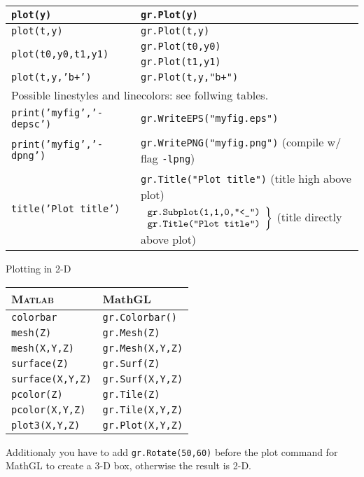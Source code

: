 \documentclass[a4paper]{article}
\newcommand{\cd}{\texttt}
\begin{document}
\begin{center}
\begin{tabular}{l|l}
  \hline
  \cd{plot(y)} & \cd{gr.Plot(y)} \\
  \hline
  \cd{plot(t,y)} & \cd{gr.Plot(t,y)} \\
  \hline
  \multirow{2}{15em}{\cd{plot(t0,y0,t1,y1)}} & \cd{gr.Plot(t0,y0)} \\
                                            & \cd{gr.Plot(t1,y1)} \\
  \cd{plot(t,y,'b+')} & \cd{gr.Plot(t,y,"b+")} \\
  \hline
  \multicolumn{2}{l}{Possible linestyles and linecolors: see follwing tables.} \\
  \hline
  \cd{print('myfig','-depsc')} & \cd{gr.WriteEPS("myfig.eps")} \\
  \cd{print('myfig','-dpng')} & \cd{gr.WritePNG("myfig.png")} (compile w/ flag \cd{-lpng}) \\
  \hline
  \multirow{2}{15em}{\cd{title('Plot title')}}  & \cd{gr.Title("Plot title")} (title high above plot) \\
                                                &$\left.\begin{array}{c}
                                                    \text{\cd{gr.Subplot(1,1,0,"<\_")}} \\
                                                    \text{\cd{gr.Title("Plot title")}}
                                                  \end{array} \right\}$
                                                    (title directly above plot) \\


  


\end{tabular}
\end{center}

\begin{center}
Plotting in 2-D

\begin{tabular}{l|l}
  \textsc{Matlab} & MathGL \\
  \hline\hline
  \cd{colorbar} & \cd{gr.Colorbar()} \\
  \hline
  \cd{mesh(Z)} & \cd{gr.Mesh(Z)} \\ 
  \cd{mesh(X,Y,Z)} & \cd{gr.Mesh(X,Y,Z)} \\
  \hline
  \cd{surface(Z)} & \cd{gr.Surf(Z)} \\ 
  \cd{surface(X,Y,Z)} & \cd{gr.Surf(X,Y,Z)} \\
  \hline
  \cd{pcolor(Z)} & \cd{gr.Tile(Z)} \\ 
  \cd{pcolor(X,Y,Z)} & \cd{gr.Tile(X,Y,Z)} \\
  \hline
  \cd{plot3(X,Y,Z)} & \cd{gr.Plot(X,Y,Z)} \\
\end{tabular} 
\end{center}
Additionaly you have to add \cd{gr.Rotate(50,60)} before the plot command for MathGL to create a 3-D box,
otherwise the result is 2-D.
\end{document}
